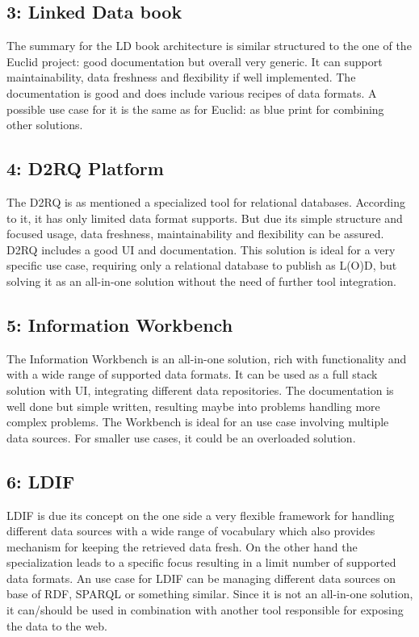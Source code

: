 \subsection*{3: Linked Data book}
The summary for the LD book architecture is similar structured to the one of the Euclid project: good documentation but overall very generic. It can support maintainability, data freshness and flexibility if well implemented. The documentation is good and does include various recipes of data formats.
A possible use case for it is the same as for Euclid: as blue print for combining other solutions.

\subsection*{4: D2RQ Platform}
The D2RQ is as mentioned a specialized tool for relational databases. According to it, it has only limited data format supports. But due its simple structure and focused usage, data freshness, maintainability and flexibility can be assured. D2RQ includes a good UI and documentation.
This solution is ideal for a very specific use case, requiring only a relational database to publish as L(O)D, but solving it as an all-in-one solution without the need of further tool integration.

\subsection*{5: Information Workbench}
The Information Workbench is an all-in-one solution, rich with functionality and with a wide range of supported data formats. It can be used as a full stack solution with UI, integrating different data repositories. The documentation is well done but simple written, resulting maybe into problems handling more complex problems.
The Workbench is ideal for an use case involving multiple data sources. For smaller use cases, it could be an overloaded solution.

\subsection*{6: LDIF}
LDIF is due its concept on the one side a very flexible framework for handling different data sources with a wide range of vocabulary which also provides mechanism for keeping the retrieved data fresh. On the other hand the specialization leads to a specific focus resulting in a limit number of supported data formats.
An use case for LDIF can be managing different data sources on base of RDF, SPARQL or something similar. Since it is not an all-in-one solution, it can/should be used in combination with another tool responsible for exposing the data to the web.

